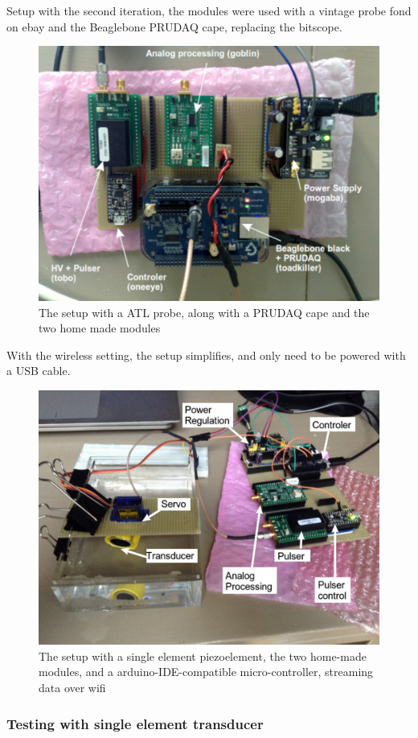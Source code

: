 \documentclass[letterpaper, 10 pt, conference]{ieeeconf} %
\begin{document}
Setup with the second iteration, the modules were used with a vintage probe fond on ebay and the Beaglebone PRUDAQ cape, replacing the bitscope.

\begin{figure}%
\centering
\includegraphics[width=.8\linewidth]{prudaq}
\caption{The setup with a ATL probe, along with a PRUDAQ cape and the two home made modules}
\label{fig:atl}
\end{figure}


With the wireless setting, the setup simplifies, and only need to be powered with a USB cable.

\begin{figure}%
\centering
\includegraphics[width=.8\linewidth]{kit-overaview}
\caption{The setup with a single element piezoelement, the two home-made modules, and a arduino-IDE-compatible micro-controller, streaming data over wifi}
\label{fig:wireless}
\end{figure}


\subsubsection{Testing with single element transducer}
\end{document}
